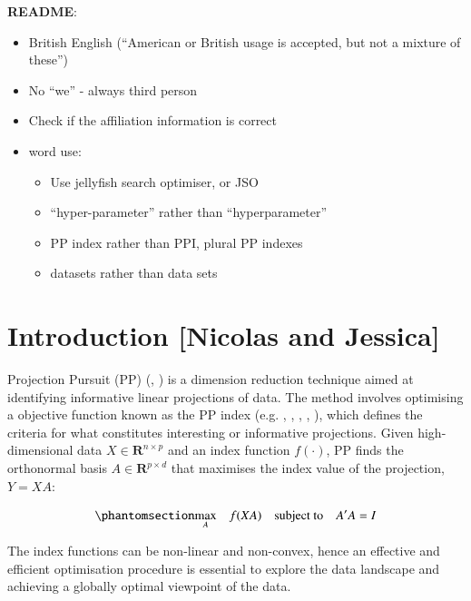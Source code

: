 \documentclass[
  number,
  preprint,
  3p]{elsarticle}
\providecommand{\tightlist}{%
  \setlength{\itemsep}{0pt}\setlength{\parskip}{0pt}}\usepackage{longtable,booktabs,array}
\begin{document}
\textbf{README}:

\begin{itemize}
\item
  British English (``American or British usage is accepted, but not a
  mixture of these'')
\item
  No ``we'' - always third person
\item
  Check if the affiliation information is correct
\item
  word use:

  \begin{itemize}
  \tightlist
  \item
    Use jellyfish search optimiser, or JSO
  \item
    ``hyper-parameter'' rather than ``hyperparameter''
  \item
    PP index rather than PPI, plural PP indexes
  \item
    datasets rather than data sets
  \end{itemize}
\end{itemize}

\section{Introduction {[}Nicolas and
Jessica{]}}\label{introduction-nicolas-and-jessica}

Projection Pursuit (PP) (\citet{kr69}, \citet{FT74}) is a dimension
reduction technique aimed at identifying informative linear projections
of data. The method involves optimising a objective function known as
the PP index (e.g. \citet{hall1989polynomial},
\citet{cook1993projection}, \citet{lee2010projection},
\citet{Loperfido2018}, \citet{Loperfido2020}), which defines the
criteria for what constitutes interesting or informative projections.
Given high-dimensional data \(X \in \mathbf{R}^{n\times p}\) and an
index function \(f(\cdot)\), PP finds the orthonormal basis
\(A \in \mathbf{R}^{p \times d}\) that maximises the index value of the
projection, \(Y = XA\):

\begin{equation}\phantomsection\label{eq-optimization}{
\underset{A}{\max } \quad f(XA) \quad \text{subject to} \quad A'A = I
}\end{equation}

The index functions can be non-linear and non-convex, hence an effective
and efficient optimisation procedure is essential to explore the data
landscape and achieving a globally optimal viewpoint of the data.
\end{document}
